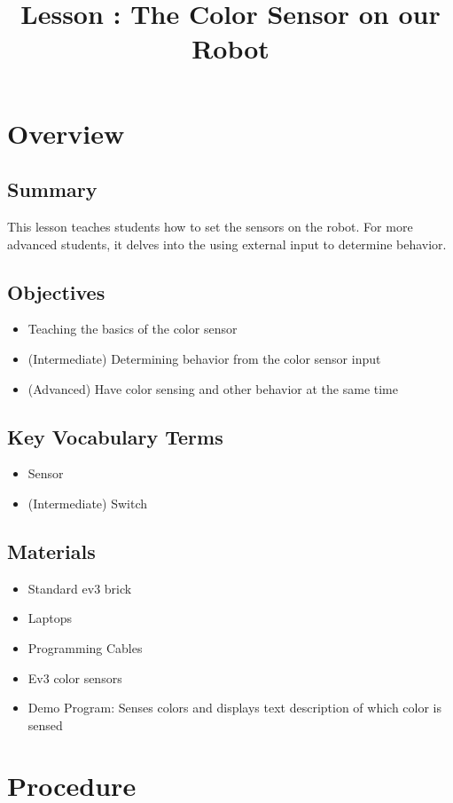\documentclass{lessonplan}
\title{Lesson \lessonNumber: The Color Sensor on our Robot}
\author{\linkHome}
\date{}
\begin{document}
  \maketitle

  \section{Overview}
    \subsection{Summary}
      This lesson teaches students how to set the sensors on the robot. For more advanced students, it delves into the using external input to determine behavior.
    \subsection{Objectives}
    \begin{itemize}
      \item Teaching the basics of the color sensor
      \item (Intermediate) Determining behavior from the color sensor input
      \item (Advanced) Have color sensing and other behavior at the same time
    \end{itemize}
    \subsection{Key Vocabulary Terms}
    \begin{itemize}
      \item Sensor
      \item (Intermediate) Switch
    \end{itemize}
    \subsection{Materials}
      \begin{itemize}
        \item Standard ev3 brick
        \item Laptops
        \item Programming Cables
        \item Ev3 color sensors
        \item Demo Program: Senses colors and displays text description of which color is sensed
      \end{itemize}
  \section{Procedure}
\end{document}

